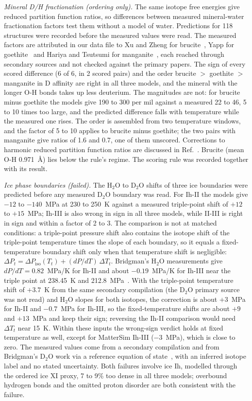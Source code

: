 \documentclass[aps,prmaterials,reprint,superscriptaddress,nofootinbib]{revtex4-2}
\begin{document}
\textit{Mineral D/H fractionation (ordering only).} The same isotope free energies give reduced partition function ratios, so differences between measured mineral-water fractionation factors test them without a model of water. Predictions for 118 structures were recorded before the measured values were read. The measured factors are attributed in our data file to Xu and Zheng for brucite~\cite{Xu1999}, Yapp for goethite~\cite{Yapp1987} and Hariya and Tsutsumi for manganite~\cite{Hariya1981}, each reached through secondary sources and not checked against the primary papers. The sign of every scored difference (6 of 6, in 2 scored pairs) and the order brucite $>$ goethite $>$ manganite in D affinity are right in all three models, and the mineral with the longer O-H bonds takes up less deuterium. The magnitudes are not: for brucite minus goethite the models give 190 to 300 per mil against a measured 22 to 46, 5 to 10 times too large, and the predicted difference falls with temperature while the measured one rises. The order is assembled from two temperature windows, and the factor of 5 to 10 applies to brucite minus goethite; the two pairs with manganite give ratios of 1.6 and 0.7, one of them unscored. Corrections to harmonic reduced partition function ratios are discussed in Ref.~\cite{LiuTossell2010}. Brucite (mean O-H 0.971~\AA) lies below the rule's regime. The scoring rule was recorded together with its result.

\textit{Ice phase boundaries (failed).} The H$_2$O to D$_2$O shifts of three ice boundaries were predicted before any measured D$_2$O boundary was read. For Ih-II the models give $-12$ to $-140$~MPa at 230 to 250~K against a measured triple-point shift of $+12$ to $+15$~MPa; Ih-III is also wrong in sign in all three models, while II-III is right in sign and within a factor of 2 to 3. The comparison is not at matched conditions: a triple-point pressure shift also contains the isotope shift of the triple-point temperature times the slope of each boundary, so it equals a fixed-temperature boundary shift only when that temperature shift is negligible: $\Delta P_t = \Delta P_{\mathrm{iso}}(T_t) + (dP/dT)\,\Delta T_t$. Bridgman's H$_2$O measurements give $dP/dT = 0.82$~MPa/K for Ih-II and about $-0.19$~MPa/K for Ih-III near the triple point at 238.45~K and 212.8~MPa~\cite{Bridgman1912}. With the triple-point temperature shift of $+3.7$~K from the same secondary compilation (the D$_2$O primary source was not read) and H$_2$O slopes for both isotopes, the correction is about $+3$~MPa for Ih-II and $-0.7$~MPa for Ih-III, so the fixed-temperature shifts are about $+9$ and $+13$~MPa and keep their sign; reversing the Ih-II comparison would need $\Delta T_t$ near 15~K. Within these inputs the wrong-sign verdict holds at fixed temperature as well, except for MatterSim Ih-III ($-3$~MPa), which is close to zero. The measured values come from a secondary compilation and from Bridgman's D$_2$O work via a reference equation of state~\cite{Bridgman1935,Herrig2018}, with an inferred isotope label and no stated uncertainty. Both failures involve ice Ih, modelled through the ordered ice XI proxy, 7 to 9\% too dense in all three models; overbound hydrogen bonds and the omitted proton disorder are both consistent with the failure.
\end{document}
